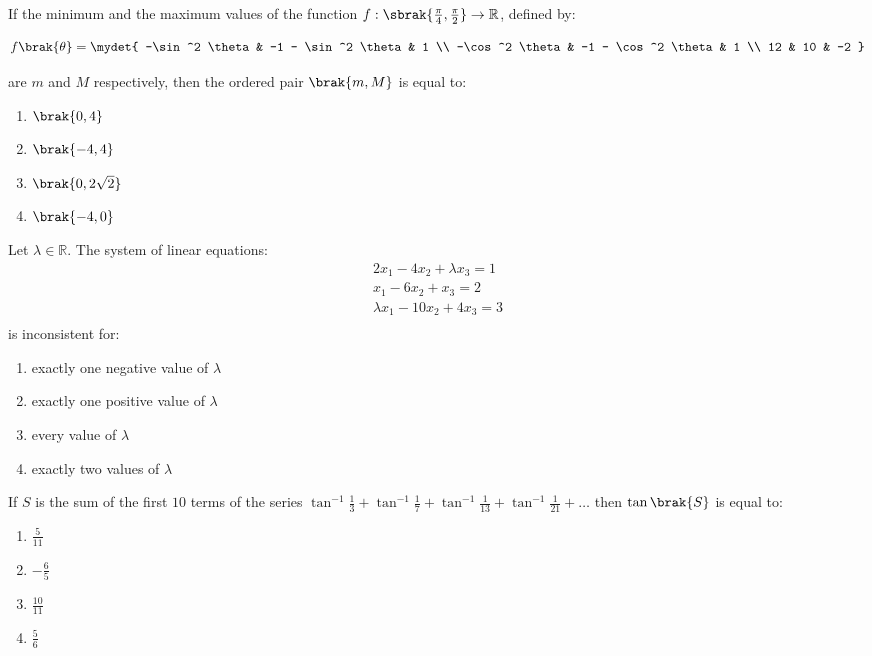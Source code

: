     \item If the minimum and the maximum values of the function $f : \sbrak{\frac{\pi}{4}, \frac{\pi}{2}} \to \mathbb{R}$, defined by:

    $$
    f\brak{\theta} = \mydet{
    -\sin^2 \theta & -1 - \sin^2 \theta & 1 \\
    -\cos^2 \theta & -1 - \cos^2 \theta & 1 \\
    12 & 10 & -2
    }
    $$
    
    are $m$ and $M$ respectively, then the ordered pair $\brak{m, M}$ is equal to:
    
    \begin{enumerate}
        \item $\brak{0, 4}$
        \item $\brak{-4, 4}$
        \item $\brak{0, 2\sqrt{2}}$
        \item $\brak{-4, 0}$
    \end{enumerate}
    

    \item Let $\lambda \in \mathbb{R}$. The system of linear equations:
    \begin{align*}
    2x_1 - 4x_2 + \lambda x_3 = 1\\
    x_1 - 6x_2 + x_3 = 2\\
    \lambda x_1 - 10x_2 + 4x_3 = 3\\
    \end{align*}
    is inconsistent for:
    \begin{enumerate}
        \item exactly one negative value of $\lambda$
        \item exactly one positive value of $\lambda$
        \item every value of $\lambda$
        \item exactly two values of $\lambda$
    \end{enumerate}

    \item If $S$ is the sum of the first $10$ terms of the series $\tan^{-1} \frac{1}{3} + \tan^{-1} \frac{1}{7} + \tan^{-1} \frac{1}{13} + \tan^{-1} \frac{1}{21} + \dots$ then $\tan\brak{S}$ is equal to:
    \begin{enumerate}
        \item $\frac{5}{11}$
        \item $-\frac{6}{5}$
        \item $\frac{10}{11}$
        \item $\frac{5}{6}$
    \end{enumerate}

